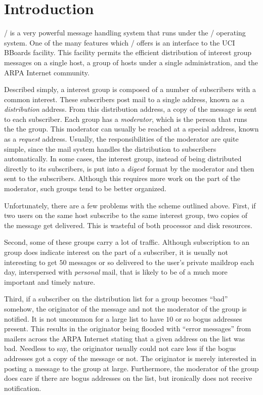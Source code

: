 \section{Introduction}
\MH/ is a very powerful message handling system that runs under the \unix/
operating system.
One of the many features which \MH/ offers is an interface to the UCI BBoards
facility.
This facility permits the efficient distribution of interest group messages
on a single host, a group of hosts under a single administration, and the
ARPA Internet community.

Described simply, a interest group is composed of a number of subscribers
with a common interest.
These subscribers post mail to a single address, known as a
{\it distribution} address.
From this distribution address, a copy of the message is sent to each
subscriber.
Each group has a {\it moderator},
which is the person that runs the the group.
This moderator can usually be reached at a special address,
known as a {\it request} address.
Usually, the responsibilities of the moderator are quite simple,
since the mail system handles the distribution to subscribers automatically.
In some cases, the interest group,
instead of being distributed directly to its subscribers,
is put into a {\it digest} format by the moderator and then sent to the
subscribers.
Although this requires more work on the part of the moderator,
such groups tend to be better organized.

Unfortunately, there are a few problems with the scheme outlined above.
First, if two users on the same host subscribe to the same interest group,
two copies of the message get delivered.
This is wasteful of both processor and disk resources.

Second,
some of these groups carry a lot of traffic.
Although subscription to an group does indicate interest on the part of a
subscriber,
it is usually not interesting to get $50$ messages or so delivered to 
the user's private maildrop each day,
interspersed with {\it personal} mail,
that is likely to be of a much more important and timely nature.

Third, if a subscriber on the distribution list for a group becomes ``bad''
somehow,
the originator of the message and not the moderator of the group is notified.
It is not uncommon for a large list to have $10$ or so bogus addresses present.
This results in the originator being flooded with ``error messages'' from
mailers across the ARPA Internet stating that a given address on the list was
bad.
Needless to say,
the originator usually could not care less if the bogus addresses got a copy
of the message or not.
The originator is merely interested in posting a message to the group at large.
Furthermore, the moderator of the group does care if there are bogus
addresses on the list,
but ironically does not receive notification.

